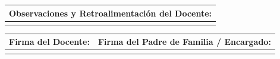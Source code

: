 \documentclass[11pt, letterpaper]{article}
\begin{document}
\vspace{0.4cm}

\noindent
\begin{tabularx}{\textwidth}{|X|}
\hline
\cellcolor{GrisTabla}\textbf{Observaciones y Retroalimentación del Docente:} \\
\hline
\vspace{1.8cm} \\
\hline
\end{tabularx}

\vspace{0.5cm}

\noindent
\begin{tabularx}{\textwidth}{|X|X|}
\hline
\cellcolor{GrisTabla}\textbf{Firma del Docente:} & \cellcolor{GrisTabla}\textbf{Firma del Padre de Familia / Encargado:} \\
\hline
\vspace{0.8cm} & \vspace{0.8cm} \\
\hline
\end{tabularx}
\end{document}
